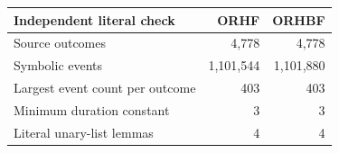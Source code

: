 \begin{tabular}{lrr}
\toprule Independent literal check & ORHF & ORHBF\\\midrule
Source outcomes & 4,778 & 4,778\\
Symbolic events & 1,101,544 & 1,101,880\\
Largest event count per outcome & 403 & 403\\
Minimum duration constant & 3 & 3\\
Literal unary-list lemmas & 4 & 4\\
\bottomrule\end{tabular}
